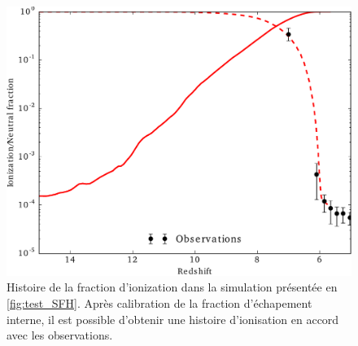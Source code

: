 \begin{figure}[bth]
        \includegraphics[width=.95\linewidth]{img/02/xion.pdf} 
        \caption{Histoire de la fraction d'ionization dans la simulation présentée en \ref{fig:test_SFH}.
        Après calibration de la fraction d'échapement interne, il est possible d'obtenir une histoire d'ionisation en accord avec les observations.
}
 		\label{fig:test_xion}
\end{figure}


%
%
%
%
%
%
